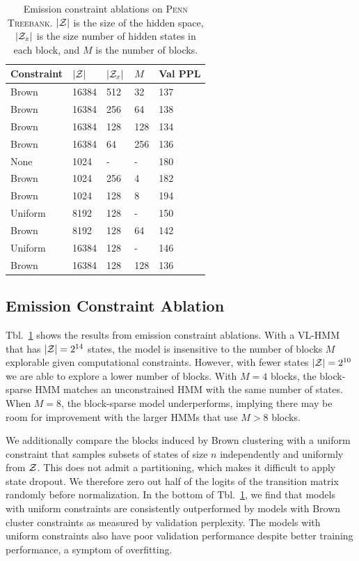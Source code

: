 \documentclass[11pt,a4paper]{article}
\begin{document}
\begin{table}[t]
\centering
\begin{tabular}{lllll}
\toprule
Constraint & $|\mathcal{Z}|$ & $|\mathcal{Z}_x|$ & $M$ & Val PPL\\
\midrule
Brown & 16384 & 512 & 32  & 137\\
Brown & 16384 & 256 & 64  & 138\\
Brown & 16384 & 128 & 128 & 134\\
Brown & 16384 & 64  & 256 & 136\\
\midrule
None  & 1024 & - & - & 180\\
Brown & 1024 & 256 & 4 & 182\\
Brown & 1024 & 128 & 8 & 194\\
\midrule
Uniform    & 8192    & 128    & -   & 150\\
Brown      & 8192    & 128    & 64  & 142\\
Uniform    & 16384   & 128    & -   & 146\\
Brown      & 16384   & 128    & 128 & 136\\
\bottomrule
\end{tabular}
\caption{\label{tbl:constraint-ablation}
Emission constraint ablations on \textsc{Penn Treebank}.
$|\mathcal{Z}|$ is the size of the hidden space, $|\mathcal{Z}_x|$ is the size number of hidden states in each block, and $M$ is the number of blocks.
}
\end{table}


\subsection{Emission Constraint Ablation}
Tbl.~\ref{tbl:constraint-ablation} shows the results from 
emission constraint ablations.
With a VL-HMM that has $|\mathcal{Z}|=2^{14}$ states,
the model is insensitive to the number of blocks $M$ explorable given computational constraints.
However, with fewer states $|\mathcal{Z}|=2^{10}$ we are able to explore a lower number of blocks.
With $M=4$ blocks, the block-sparse HMM matches an unconstrained HMM
with the same number of states.
When $M=8$, the block-sparse model underperforms,
implying there may be room for improvement with the larger
HMMs that use $M > 8$ blocks.

We additionally compare the blocks induced by Brown clustering with a uniform
constraint that samples subsets of states of size $n$
independently and uniformly from $\mathcal{Z}$.
This does not admit a partitioning, which makes it difficult to apply state dropout.
We therefore zero out half of the logits of the transition matrix randomly
before normalization.
In the bottom of Tbl.~\ref{tbl:constraint-ablation},
we find that models with uniform constraints
are consistently outperformed by models with Brown cluster constraints
as measured by validation perplexity.
The models with uniform constraints also have poor validation performance
despite better training performance, a symptom of overfitting.
\end{document}
